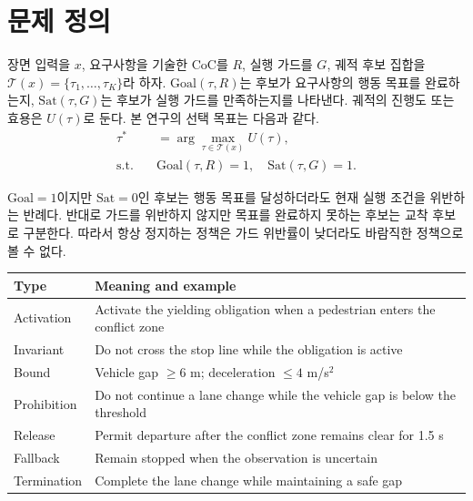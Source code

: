 \section{문제 정의}
\label{sec:problem}

장면 입력을 $x$, 요구사항을 기술한 CoC를 $R$, 실행 가드를 $G$, 궤적 후보 집합을 $\mathcal{T}(x)=\{\tau_1,\ldots,\tau_K\}$라 하자. $\mathrm{Goal}(\tau,R)$는 후보가 요구사항의 행동 목표를 완료하는지, $\mathrm{Sat}(\tau,G)$는 후보가 실행 가드를 만족하는지를 나타낸다. 궤적의 진행도 또는 효용은 $U(\tau)$로 둔다. 본 연구의 선택 목표는 다음과 같다.
\begin{equation}
\begin{aligned}
\tau^*&=\arg\max_{\tau\in\mathcal{T}(x)} U(\tau),\\
\mathrm{s.t.}\quad &\mathrm{Goal}(\tau,R)=1,\quad \mathrm{Sat}(\tau,G)=1.
\end{aligned}
\label{eq:selection}
\end{equation}

$\mathrm{Goal}=1$이지만 $\mathrm{Sat}=0$인 후보는 행동 목표를 달성하더라도 현재 실행 조건을 위반하는 반례다. 반대로 가드를 위반하지 않지만 목표를 완료하지 못하는 후보는 교착 후보로 구분한다. 따라서 항상 정지하는 정책은 가드 위반률이 낮더라도 바람직한 정책으로 볼 수 없다.

\begin{table}[t]
\centering
{}
\label{tab:taxonomy}
\footnotesize
\begin{tabularx}{\columnwidth}{L{0.30\columnwidth}Y}
\toprule
Type & Meaning and example \\
\midrule
Activation & Activate the yielding obligation when a pedestrian enters the conflict zone \\
Invariant & Do not cross the stop line while the obligation is active \\
Bound & Vehicle gap $\geq6$ m; deceleration $\leq4$ m/s$^2$ \\
Prohibition & Do not continue a lane change while the vehicle gap is below the threshold \\
Release & Permit departure after the conflict zone remains clear for 1.5 s \\
Fallback & Remain stopped when the observation is uncertain \\
Termination & Complete the lane change while maintaining a safe gap \\
\bottomrule
\end{tabularx}
\end{table}


